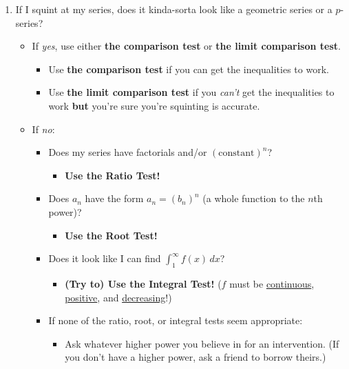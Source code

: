 \documentclass[12pt]{article}
\newcommand{\infsum}[3]{\sum_{{#1}={#2}}^\infty {#3}}
\begin{document}
\begin{enumerate}
		\item If I squint at my series, does it kinda-sorta look like a geometric series or a $p$-series?
			\begin{itemize}
				\item If \textit{yes}, use either \textbf{the comparison test} or \textbf{the limit comparison test}. 
				\begin{itemize}
					\item Use \textbf{the comparison test} if you can get the inequalities to work.
					\item Use \textbf{the limit comparison test} if you \textit{can't} get the inequalities to work \textbf{but} you're sure you're squinting is accurate.
				\end{itemize}
				\item If \textit{no}:
				\begin{itemize}
					\item Does my series have factorials and/or $(\text{constant})^n$? 
						\begin{itemize}
							\item \textbf{Use the Ratio Test!}
						\end{itemize}
					\item Does $a_n$ have the form $a_n=(b_n)^n$ ({\footnotesize{a whole function to the $n$th power}})? 
						\begin{itemize}
							\item \textbf{Use the Root Test!}
						\end{itemize}
					\item Does it look like I can find $\textstyle\int_1^\infty f(x)\,dx$? 
						\begin{itemize}
							\item \textbf{(Try to) Use the Integral Test!} ({\footnotesize{$f$ must be \ul{continuous}, \ul{positive}, and \ul{decreasing}!}})
						\end{itemize}
					\item If none of the ratio, root, or integral tests seem appropriate: 
					\begin{itemize}
						\item Ask whatever higher power you believe in for an intervention. ({\footnotesize{If you don't have a higher power, ask a friend to borrow theirs.}})
					\end{itemize}
				\end{itemize}

\end{itemize}
\end{enumerate}
\end{document}
